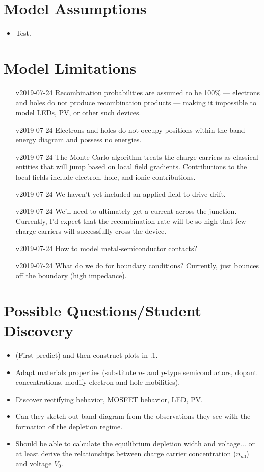 \documentclass[12pt]{exam}
\begin{document}
\section{Model Assumptions}
\begin{itemize}
    \item Test.
\end{itemize}

\section{Model Limitations}

\begin{itemize}
    \item [v2019-07-24] Recombination probabilities are assumed to be 100\% --- electrons and holes do not produce recombination products --- making it impossible to model LEDs, PV, or other such devices.
    \item [v2019-07-24] Electrons and holes do not occupy positions within the band energy diagram and possess no energies.
    \item [v2019-07-24] The Monte Carlo algorithm treats the charge carriers as classical entities that will jump based on local field gradients. Contributions to the local fields include electron, hole, and ionic contributions.
    \item [v2019-07-24] We haven't yet included an applied field to drive drift.
    \item [v2019-07-24] We'll need to ultimately get a current across the junction. Currently, I'd expect that the recombination rate will be so high that few charge carriers will successfully cross the device.
    \item [v2019-07-24] How to model metal-semiconductor contacts?
    \item [v2019-07-24] What do we do for boundary conditions? Currently, just bounces off the boundary (high impedance).
\end{itemize}

\section{Possible Questions/Student Discovery}

\begin{itemize}
    \item (First predict)  and then construct plots in .1.
    \item Adapt materials properties (substitute $n$- and $p$-type semiconductors, dopant concentrations, modify electron and hole mobilities).
    \item Discover rectifying behavior, MOSFET behavior, LED, PV.
    \item Can they sketch out band diagram from the observations they see with the formation of the depletion regime.
    \item Should be able to calculate the equilibrium depletion width and voltage... or at least derive the relationships between charge carrier concentration ($n_{n0}$) and voltage $V_0$.
\end{itemize}
\end{document}
